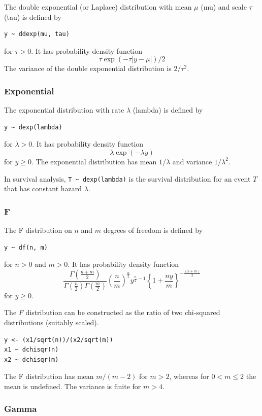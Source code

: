 \documentclass[11pt, a4paper, titlepage]{report}
\begin{document}
The double exponential (or Laplace) distribution with mean $\mu$ (mu) and
scale $\tau$ (tau) is defined by
\begin{verbatim}
y ~ ddexp(mu, tau)
\end{verbatim}
for $\tau > 0$. It has probability density function
\[
\tau \exp(-\tau | y - \mu |)/2
\]
The variance of the double exponential distribution is $2/\tau^2$.

\subsubsection{Exponential}
\label{bugs:dexp}

The exponential distribution with rate $\lambda$ (lambda) is defined by
\begin{verbatim}
y ~ dexp(lambda)
\end{verbatim}
for $\lambda > 0$. It has probability density function
\[
\lambda \exp(-\lambda y)
\]
for $y \geq 0$. The exponential distribution has mean $1/\lambda$ and
variance $1/\lambda^2$.

In survival analysis, \verb+T ~ dexp(lambda)+ is the survival distribution
for an event $T$ that has constant hazard $\lambda$.

\subsubsection{F}
\label{bugs:df}

The F distribution on $n$ and $m$ degrees of freedom is defined by
\begin{verbatim}
y ~ df(n, m)
\end{verbatim}
for $n > 0$ and $m > 0$. It has probability density function
\[
\frac{\Gamma(\frac{n + m}{2})}
     {\Gamma(\frac{n}{2}) \Gamma(\frac{m}{2})}
     \left(\frac{n}{m} \right)^{\frac{n}{2}} y^{\frac{n}{2} - 1} 
     \left\{1 + \frac{ny}{m} \right\}^{-\frac{(n + m)}{2}}
\]
for $y \geq 0$.       

The $F$ distribution can be constructed as the ratio of two chi-squared
distributions (suitably scaled).
\begin{verbatim}
y <- (x1/sqrt(n))/(x2/sqrt(m))
x1 ~ dchisqr(n)
x2 ~ dchisqr(m)
\end{verbatim}
The F distribution has mean $m/(m-2)$ for $m > 2$, whereas for $0 < m \leq 2$
the mean is undefined. The variance is finite for $m > 4$.

\subsubsection{Gamma}
\label{bugs:dgamma}
\end{document}
